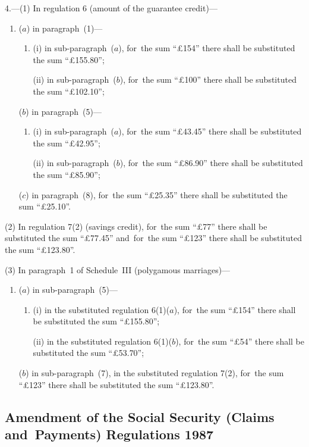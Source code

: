 \documentclass[12pt,a4paper]{article}
\begin{document}
4.---(1)  In regulation 6 (amount of the guarantee credit)—
\begin{enumerate}\item[]
($a$) in paragraph~(1)—
\begin{enumerate}\item[]
(i) in sub-paragraph~($a$), for~the sum “£154” there shall be substituted the sum “£155$.$80”;

(ii) in sub-paragraph~($b$), for~the sum “£100” there shall be substituted the sum “£102$.$10”;
\end{enumerate}

($b$) in paragraph~(5)—
\begin{enumerate}\item[]
(i) in sub-paragraph~($a$), for~the sum “£43$.$45” there shall be substituted the sum “£42$.$95”;

(ii) in sub-paragraph~($b$), for~the sum “£86$.$90” there shall be substituted the sum “£85$.$90”;
\end{enumerate}

($c$) in paragraph~(8), for~the sum “£25$.$35” there shall be substituted the sum “£25$.$10”.
\end{enumerate}

(2) In regulation 7(2) (savings credit), for~the sum “£77” there shall be substituted the sum “£77$.$45” and~for~the sum “£123” there shall be substituted the sum “£123$.$80”.

(3) In paragraph~1 of Schedule~III (polygamous marriages)—
\begin{enumerate}\item[]
($a$) in sub-paragraph~(5)—
\begin{enumerate}\item[]
(i) in the substituted regulation 6(1)($a$), for~the sum “£154” there shall be substituted the sum “£155$.$80”;

(ii) in the substituted regulation 6(1)($b$), for~the sum “£54” there shall be substituted the sum “£53$.$70”;
\end{enumerate}

($b$) in sub-paragraph~(7), in the substituted regulation 7(2), for~the sum “£123” there shall be substituted the sum “£123$.$80”.
\end{enumerate}

\subsection[5. Amendment of the Social Security (Claims and~Payments) Regulations 1987]{Amendment of the Social Security (Claims and~Payments) Regulations 1987}
\end{document}
